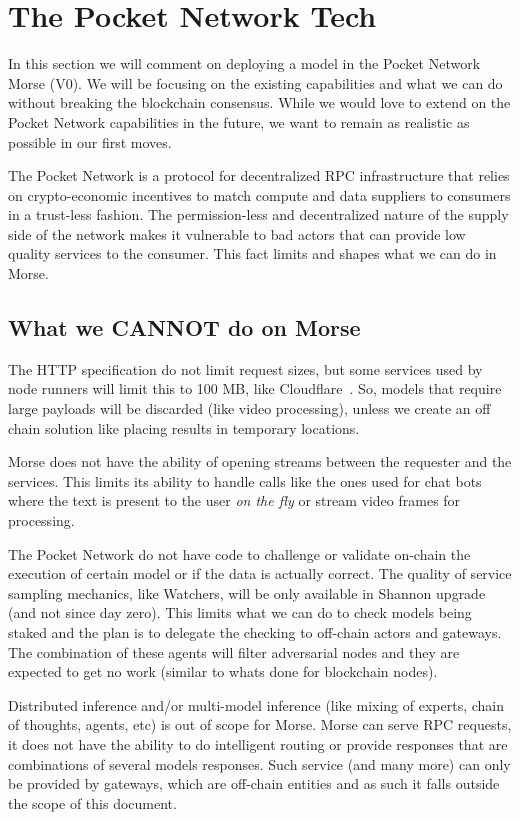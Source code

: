 \section{The Pocket Network Tech}\label{sec:c}

In this section we will comment on deploying a model in the Pocket Network Morse (V0).
We will be focusing on the existing capabilities and what we can do without breaking the blockchain consensus. While we would love to extend on the Pocket Network capabilities in the future, we want to remain as realistic as possible in our first moves.

The Pocket Network is a protocol for decentralized \gls{RPC} infrastructure that relies on crypto-economic incentives to match compute and data suppliers to consumers in a trust-less fashion. The permission-less and decentralized nature of the supply side of the network makes it vulnerable to bad actors that can provide low quality services to the consumer. This fact limits and shapes what we can do in Morse.


\subsection{What we CANNOT do on Morse}
The HTTP specification do not limit request sizes, but some services used by node runners will limit this to 100 MB, like Cloudflare~\cite{cloudflareLimitsCloudflare}. So, models that require large payloads will be discarded (like video processing), unless we create an off chain solution like placing results in temporary locations.

Morse does not have the ability of opening streams between the requester and the services. This limits its ability to handle calls like the ones used for chat bots where the text is present to the user \emph{on the fly} or stream video frames for processing.

The Pocket Network do not have code to challenge or validate on-chain the execution of certain model or if the data is actually correct. The quality of service sampling mechanics, like Watchers, will be only available in Shannon upgrade (and not since day zero). This limits what we can do to check models being staked and the plan is to delegate the checking to off-chain actors and gateways. The combination of these agents will filter adversarial nodes and they are expected to get no work (similar to whats done for blockchain nodes).

Distributed inference and/or multi-model inference (like mixing of experts, chain of thoughts, agents, etc) is out of scope for Morse. Morse can serve \gls{RPC} requests, it does not have the ability to do intelligent routing or provide responses that are combinations of several models responses. Such service (and many more) can only be provided by gateways, which are off-chain entities and as such it falls outside the scope of this document.



